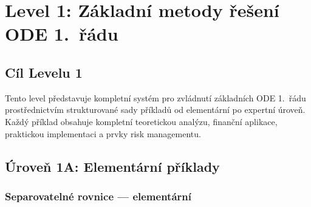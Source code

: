 \section{Level 1: Základní metody řešení ODE 1.~řádu}
\label{chap:level1}

\subsection*{Cíl Levelu 1}
Tento level představuje kompletní systém pro zvládnutí základních ODE 1.~řádu prostřednictvím strukturované sady příkladů od elementární po expertní úroveň. Každý příklad obsahuje kompletní teoretickou analýzu, finanční aplikace, praktickou implementaci a prvky risk managementu.

\subsection{Úroveň 1A: Elementární příklady}
\label{sec:uroven-1a}

\subsubsection{Separovatelné rovnice — elementární}
\label{subsec:1a-separovatelne}

